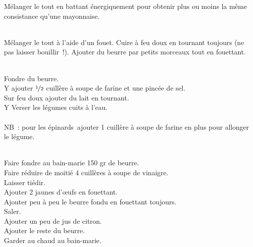 \begin{minipage}[c]{\textwidth}
Mélanger le tout en battant énergiquement pour obtenir plus ou moins la même consistance qu’une mayonnaise.\\
\\

\end{minipage}

\begin{minipage}[c]{\textwidth}
Mélanger le tout à l’aide d’un fouet. Cuire à feu doux en tournant toujours (ne pas laisser bouillir !). Ajouter du beurre par petits morceaux tout en fouettant.\\
\\

\end{minipage}

\begin{minipage}[c]{\textwidth}
Fondre du beurre.\\
Y ajouter $\nicefrac{1}{2}$ cuillère à soupe de farine et une pincée de sel.\\
Sur feu doux ajouter du lait en tournant. \\
Y Verser les légumes cuits à l’eau.\\
\\
NB : pour les épinards ajouter 1 cuillère à soupe de farine en plus pour allonger le légume. \\
\\

\end{minipage}

\begin{minipage}[c]{\textwidth}
Faire fondre au bain-marie 150 gr de beurre.\\
Faire réduire de moitié 4 cuillères à soupe de vinaigre.\\
Laisser tiédir.\\
Ajouter 2 jaunes d’œufs en fouettant.\\
Ajouter peu à peu le beurre fondu en fouettant toujours. \\
Saler.\\
Ajouter un peu de jus de citron.\\
Ajouter le reste du beurre.\\
Garder au chaud au bain-marie.\\
\\

\end{minipage}

